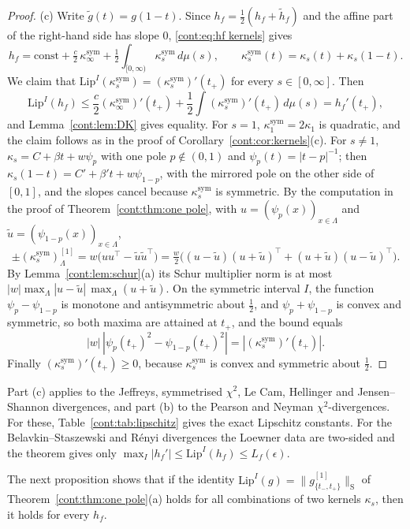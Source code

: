 \begin{proof}
(c) Write $\tilde g(t)=g(1-t)$. Since $h_f=\frac12(h_f+\tilde h_f)$ and the affine part of the right-hand side has slope $0$, \eqref{cont:eq:hf kernels} gives
\[
h_f=\mathrm{const}+\tfrac c2\,\kappa^{\mathrm{sym}}_\infty+\tfrac12\int_{[0,\infty)}\kappa^{\mathrm{sym}}_s\,d\mu(s),\qquad \kappa^{\mathrm{sym}}_s(t)=\kappa_s(t)+\kappa_s(1-t).
\]
We claim that $\mathrm{Lip}^I(\kappa^{\mathrm{sym}}_s)=(\kappa^{\mathrm{sym}}_s)'(t_+)$ for every $s\in[0,\infty]$. Then
\[
\mathrm{Lip}^I(h_f)\leq\frac c2(\kappa^{\mathrm{sym}}_\infty)'(t_+)+\frac12\int(\kappa^{\mathrm{sym}}_s)'(t_+)\,d\mu(s)=h_f'(t_+),
\]
and Lemma~\ref{cont:lem:DK} gives equality. For $s=1$, $\kappa^{\mathrm{sym}}_1=2\kappa_1$ is quadratic, and the claim follows as in the proof of Corollary~\ref{cont:cor:kernels}(c). For $s\neq1$, $\kappa_s=C+\beta t+w\psi_p$ with one pole $p\notin(0,1)$ and $\psi_p(t)=|t-p|^{-1}$; then $\kappa_s(1-t)=C'+\beta' t+w\psi_{1-p}$, with the mirrored pole on the other side of $[0,1]$, and the slopes cancel because $\kappa^{\mathrm{sym}}_s$ is symmetric. By the computation in the proof of Theorem~\ref{cont:thm:one pole}, with $u=(\psi_p(x))_{x\in\Lambda}$ and $\tilde u=(\psi_{1-p}(x))_{x\in\Lambda}$,
\[
\pm(\kappa^{\mathrm{sym}}_s)^{[1]}_\Lambda=w\big(uu^\top-\tilde u\tilde u^\top\big)=\tfrac w2\big((u-\tilde u)(u+\tilde u)^\top+(u+\tilde u)(u-\tilde u)^\top\big).
\]
By Lemma~\ref{cont:lem:schur}(a) its Schur multiplier norm is at most $|w|\max_\Lambda|u-\tilde u|\,\max_\Lambda(u+\tilde u)$. On the symmetric interval $I$, the function $\psi_p-\psi_{1-p}$ is monotone and antisymmetric about $\frac12$, and $\psi_p+\psi_{1-p}$ is convex and symmetric, so both maxima are attained at $t_+$, and the bound equals
\[
|w|\,|\psi_p(t_+)^2-\psi_{1-p}(t_+)^2|=|(\kappa^{\mathrm{sym}}_s)'(t_+)|.
\]
Finally $(\kappa^{\mathrm{sym}}_s)'(t_+)\geq0$, because $\kappa^{\mathrm{sym}}_s$ is convex and symmetric about $\frac12$.
\end{proof}
 
Part (c) applies to the Jeffreys, symmetrised $\chi^2$, Le Cam, Hellinger and Jensen--Shannon divergences, and part (b) to the Pearson and Neyman $\chi^2$-divergences. For these, Table~\ref{cont:tab:lipschitz} gives the exact Lipschitz constants. For the Belavkin--Staszewski and R\'enyi divergences the Loewner data are two-sided and the theorem gives only $\max_I|h_f'|\leq\mathrm{Lip}^I(h_f)\leq L_f(\epsilon)$.
 

 
The next proposition shows that if the identity $\mathrm{Lip}^I(g)=\|g^{[1]}_{\{t_-,t_+\}}\|_{\mathrm S}$ of Theorem~\ref{cont:thm:one pole}(a) holds for all combinations of two kernels $\kappa_s$, then it holds for every $h_f$.
 
